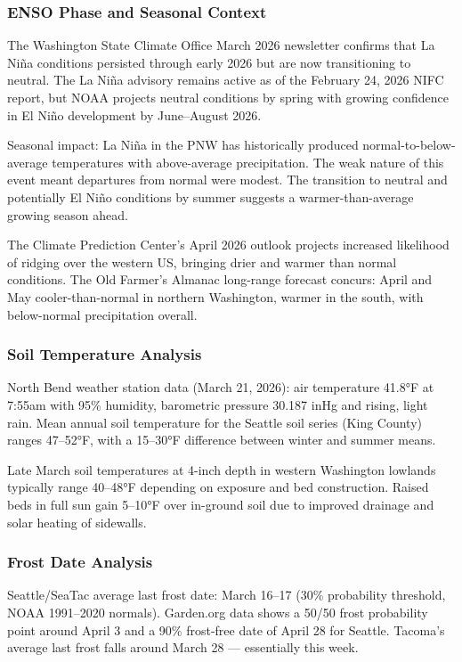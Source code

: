 \documentclass[11pt,letterpaper]{article}
\begin{document}
\subsubsection{ENSO Phase and Seasonal Context}

The Washington State Climate Office March 2026 newsletter confirms that La Niña conditions persisted through early 2026 but are now transitioning to neutral. The La Niña advisory remains active as of the February 24, 2026 NIFC report, but NOAA projects neutral conditions by spring with growing confidence in El Niño development by June--August 2026.

Seasonal impact: La Niña in the PNW has historically produced normal-to-below-average temperatures with above-average precipitation. The weak nature of this event meant departures from normal were modest. The transition to neutral and potentially El Niño conditions by summer suggests a warmer-than-average growing season ahead.

The Climate Prediction Center's April 2026 outlook projects increased likelihood of ridging over the western US, bringing drier and warmer than normal conditions. The Old Farmer's Almanac long-range forecast concurs: April and May cooler-than-normal in northern Washington, warmer in the south, with below-normal precipitation overall.

\subsubsection{Soil Temperature Analysis}

North Bend weather station data (March 21, 2026): air temperature 41.8°F at 7:55am with 95\% humidity, barometric pressure 30.187 inHg and rising, light rain. Mean annual soil temperature for the Seattle soil series (King County) ranges 47--52°F, with a 15--30°F difference between winter and summer means.

Late March soil temperatures at 4-inch depth in western Washington lowlands typically range 40--48°F depending on exposure and bed construction. Raised beds in full sun gain 5--10°F over in-ground soil due to improved drainage and solar heating of sidewalls.

\subsubsection{Frost Date Analysis}

Seattle/SeaTac average last frost date: March 16--17 (30\% probability threshold, NOAA 1991--2020 normals). Garden.org data shows a 50/50 frost probability point around April 3 and a 90\% frost-free date of April 28 for Seattle. Tacoma's average last frost falls around March 28 --- essentially this week.
\end{document}

